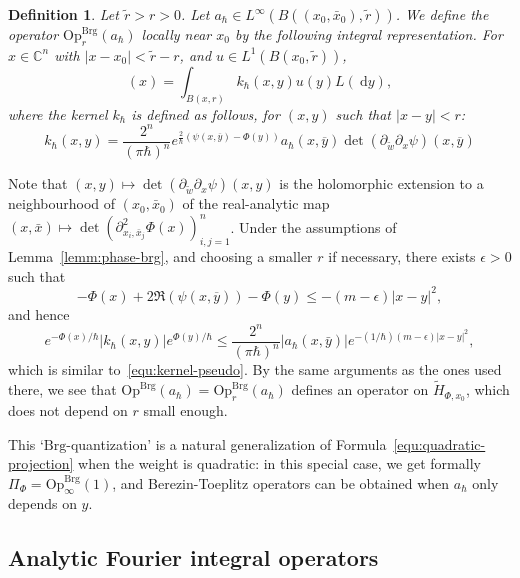 \documentclass{article}
\newtheorem{defi}[theo]{Definition}
\newcommand{\Op}{\mathrm{Op}}
\newcommand{\Brg}{\mathrm{Brg}}
\newcommand{\abs}[1]{\left|#1\right|}
\newcommand{\Opbrg}{\Op^{\Brg}}
\newcommand{\DD}{\:\!\mathrm{d}}
\newcommand{\CM}{\mathbb{C}}
\newcommand{\h}{\hbar}
\begin{document}
\begin{defi}
  \label{defi:brg-quantization}
  Let $\tilde r > r>0$. Let
  $a_\h\in L^\infty(B((x_0,\bar x_0),\tilde r))$. We define the
  operator $\Opbrg_r(a_\h)$ locally near $x_0$ by the following
  integral representation. For $x\in\CM^n$ with
  $\abs{x-x_0}<\tilde r - r$, and $u\in L^1(B(x_0,\tilde r))$,
  \begin{equation}
    [\Opbrg_{r}(a_\h) u] (x) = \int_{B(x,r)} k_{ \hbar}(x, y) u(y) L(\DD y),
    \label{equ:kernel-brg}
  \end{equation}
  where the kernel $k_{ \hbar}$ is defined as follows, for $(x, y)$
  such that $|x-y| < r$:
  \[
  k_{ \h}(x, y) = \frac{2^n}{(\pi\h)^n} e^{\frac{2}{\h}( \psi(x,
    \overline{y}) - \Phi(y))} a_{ \hbar}(x,\overline{y}) \det
  \left(\partial_{\tilde w}\partial_x \psi \right)(x, \overline{y})
  \]
\end{defi}
Note that
$(x,y)\mapsto \det \left(\partial_{\tilde w}\partial_x \psi \right)
(x, y)$
is the holomorphic extension to a neighbourhood of $(x_0,\bar x_0)$ of
the real-analytic map
$(x,\bar x)\mapsto \det ( \partial^2_{x_i, \bar{x}_j} \Phi(x) )_{i,
  j=1}^n$.
Under the assumptions of Lemma~\ref{lemm:phase-brg}, and choosing a
smaller $r$ if necessary, there exists $\epsilon>0$ such that
\[
- \Phi(x) + 2 \Re \left( \psi(x, \overline{y}) \right) - \Phi(y) \leq
- \left(m - \epsilon \right) |x-y|^2 ,
\]
and hence
\begin{equation}
  e^{- \Phi(x)/ \hbar} \left| k_{ \h}(x, y) \right| e^{ \Phi(y)/
    \hbar}\leq \frac{2^n}{(\pi\h)^n} \abs{a_\h(x,\bar y)} e^{-(1/
    \hbar)(m - \epsilon) |x-y|^2},
  \label{equ:brg-bon-contour}
\end{equation}
which is similar to~\eqref{equ:kernel-pseudo}. By the same arguments
as the ones used there, we see that $\Opbrg(a_\h)= \Opbrg_r(a_\h)$
defines an operator on $\widetilde H_{\Phi, x_0}$, which does not
depend on $r$ small enough.

This `$\Brg$-quantization' is a natural generalization of
Formula~\eqref{equ:quadratic-projection} when the weight is quadratic:
in this special case, we get formally $\Pi_\Phi = \Opbrg_\infty(1)$,
and Berezin-Toeplitz operators can be obtained when $a_\h$ only
depends on $y$.





\subsection{Analytic Fourier integral operators}
\label{sec:fio}
\end{document}
